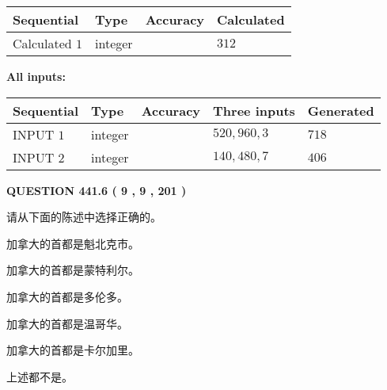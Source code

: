 \documentclass{ctexart}
\begin{document}
   
   
   
\noindent{}
   
   
  
  
\noindent\begin{tabular}{|l|l|l|l|}
\hline
 Sequential & Type & Accuracy & Calculated \\ 
\hline
 
 
  Calculated $  1 $ & integer &  & 
  $ 312 $ 
 \\  \hline  
 \end{tabular}
   
   
   
   
\noindent\vspace{0.1in}\hspace{-0.08in} {\textbf{\Large{All inputs: }}}
   
   
  
  
\noindent\begin{tabular}{|l|l|l|l|l|}
\hline
 Sequential & Type & Accuracy & Three inputs & Generated \\ 
\hline
 
 
  INPUT $  1 $ & integer &  & $
 520
 , 
 960
 , 
 3
 $ & $ 718 $ 
 \\  \hline  
 
 
  INPUT $  2 $ & integer &  & $
 140
 , 
 480
 , 
 7
 $ & $ 406 $ 
 \\  \hline  
 \end{tabular}
   
   
  
\vspace{0.2in}
  
{\textbf{\Large{QUESTION
441.6 
 ( 9 , 9 , 201 )
}}}
  
  
请从下面的陈述中选择正确的。
 
 
加拿大的首都是魁北克市。
 
 
加拿大的首都是蒙特利尔。
 
 
加拿大的首都是多伦多。
 
 
加拿大的首都是温哥华。
 
 
加拿大的首都是卡尔加里。
 
 
 上述都不是。
 
 
\noindent{}
 
\end{document}
